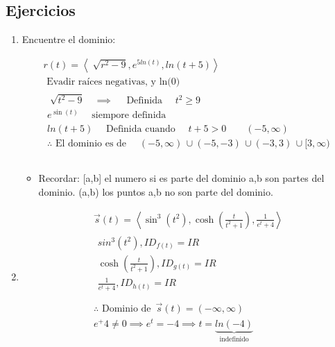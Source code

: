 \subsection{Ejercicios}
\begin{enumerate}
    \item Encuentre el dominio:
        \begin{center}
            \begin{align*}
                r(t) = \left\langle \sqrt[]{r^2-9}, e^{5ln(t)}, ln(t+5) \right\rangle \\ 
                \text{  Evadir raíces negativas, y ln(0)  } \\ 
                \begin{matrix}
                    \sqrt[]{t^2-9} \quad \implies \quad \text{  Definida   } \quad t^2 \geq 9 \\ 
                    e^{\sin(t)} \quad \text{  siempore definida  } \\ 
                    ln(t+5) \quad \text{  Definida cuando   } \quad t +5 > 0 \quad \quad (-5, \infty ) \\ 
                    \therefore \text{  El dominio es de   } \quad (-5,\infty ) \, \cup (-5,-3) \, \cup (-3,3) \, \cup [3,\infty ) \\ 
                \end{matrix} \\ 
            \end{align*}
        \end{center}
        \begin{itemize} %
            \item Recordar: [a,b] el numero si es parte del dominio a,b son partes del dominio. (a,b) los puntos a,b no son parte del dominio.
        \end{itemize}
    \item \begin{center}
        \begin{align*}
            \vec{s}(t) = \left\langle \sin^3(t^2), \cosh(\frac{t}{t^2+1} ), \frac{1}{e^t+4}  \right\rangle \\ 
            \begin{matrix}
                sin^3(t^2), ID_{f(t)} = IR \\ 
                \cosh(\frac{t}{t^2+1} ), ID_{g(t)} = IR \\ 
                \frac{1}{e^t+4}, ID_{h(t)} = IR \\ 
            \end{matrix} \\ 
            \therefore \text{  Dominio de   } \, \vec{s}(t) = (-\infty ,\infty ) \\ 
            e^+4\neq 0 \implies e^t=-4 \implies t = \underbrace{ln(-4)}_{\text{  indefinido  }} \\ 
        \end{align*}
    \end{center}
\end{enumerate}


